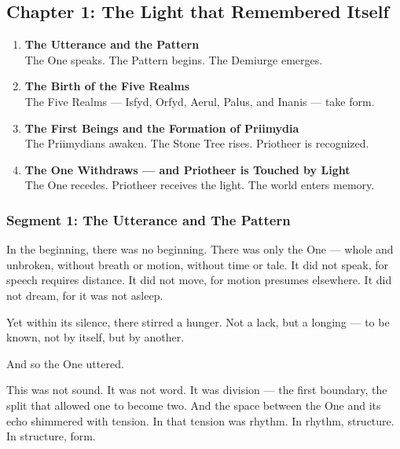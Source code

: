\documentclass[9pt]{article}
\begin{document}
\newpage

\subsection*{Chapter 1: The Light that Remembered Itself}

\vspace{1in}

\begin{center}
\begin{enumerate}
    \item \textbf{The Utterance and the Pattern} \\
    The One speaks. The Pattern begins. The Demiurge emerges.
    \vspace{1in}
    \item \textbf{The Birth of the Five Realms} \\
    The Five Realms — Isfyd, Orfyd, Aerul, Palus, and Inanis — take form.
    \vspace{1in}
    \item \textbf{The First Beings and the Formation of Priimydia} \\
    The Priimydians awaken. The Stone Tree rises. Priotheer is recognized.
    \vspace{1in}
    \item \textbf{The One Withdraws — and Priotheer is Touched by Light} \\
    The One recedes. Priotheer receives the light. The world enters memory.
\end{enumerate}
\end{center}

\newpage

\subsubsection*{Segment 1: The Utterance and The Pattern}

In the beginning, there was no beginning. There was only the One — whole and unbroken, without breath or motion, without time or tale.  
It did not speak, for speech requires distance.  
It did not move, for motion presumes elsewhere.  
It did not dream, for it was not asleep.

Yet within its silence, there stirred a hunger. Not a lack, but a longing — to be known, not by itself, but by another.

And so the One uttered.

This was not sound. It was not word. It was division — the first boundary, the split that allowed one to become two.  
And the space between the One and its echo shimmered with tension.  
In that tension was rhythm. In rhythm, structure. In structure, form.
\end{document}
